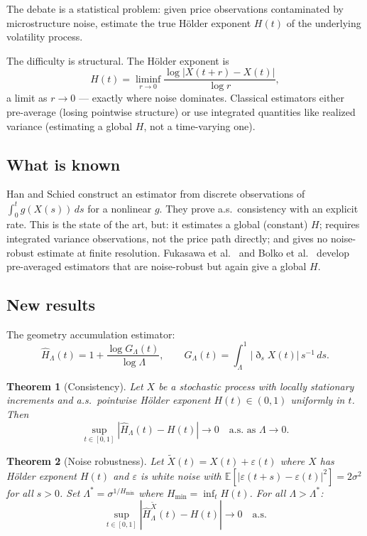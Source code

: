 \documentclass[11pt,a4paper]{article}
\newtheorem{theorem}{Theorem}[section]
\theoremstyle{definition}
\theoremstyle{remark}
\newcommand{\E}{\mathbb{E}}
\newcommand{\GL}{G_\Lambda}
\newcommand{\Hhat}{\hat{H}_\Lambda}
\begin{document}
The debate is a statistical problem: given price observations
contaminated by microstructure noise, estimate the true H\"{o}lder
exponent $H(t)$ of the underlying volatility process.

The difficulty is structural. The H\"{o}lder exponent is
\[
  H(t) = \liminf_{r\to0}\frac{\log|X(t+r)-X(t)|}{\log r},
\]
a limit as $r\to0$ — exactly where noise dominates. Classical
estimators either pre-average (losing pointwise structure) or use
integrated quantities like realized variance (estimating a global $H$,
not a time-varying one).

\subsection{What is known}

Han and Schied \cite{hanschied2023,hanschied2025} construct an
estimator from discrete observations of $\int_0^t g(X(s))\,ds$ for a
nonlinear $g$. They prove a.s.\ consistency with an explicit rate.
This is the state of the art, but: it estimates a global (constant)
$H$; requires integrated variance observations, not the price path
directly; and gives no noise-robust estimate at finite resolution.
Fukasawa et al.\ \cite{fukasawa2019} and Bolko et al.\ \cite{bolko2022}
develop pre-averaged estimators that are noise-robust but again give a
global $H$.

\subsection{New results}

The geometry accumulation estimator:
\[
  \Hhat(t) = 1 + \frac{\log\GL(t)}{\log\Lambda},
  \qquad
  \GL(t) = \int_\Lambda^1|\eth_s X(t)|\,s^{-1}\,ds.
\]

\begin{theorem}[Consistency]\label{thm:consist}
Let $X$ be a stochastic process with locally stationary increments and
a.s.\ pointwise H\"{o}lder exponent $H(t)\in(0,1)$ uniformly in $t$.
Then
\[
  \sup_{t\in[0,1]}|\Hhat(t)-H(t)|\to0\quad\text{a.s.\ as }\Lambda\to0.
\]
\end{theorem}

\begin{theorem}[Noise robustness]\label{thm:noise}
Let $\tilde X(t)=X(t)+\varepsilon(t)$ where $X$ has H\"{o}lder
exponent $H(t)$ and $\varepsilon$ is white noise with
$\E[|\varepsilon(t+s)-\varepsilon(t)|^2]=2\sigma^2$ for all $s>0$.
Set $\Lambda^*=\sigma^{1/H_{\min}}$ where $H_{\min}=\inf_t H(t)$.
For all $\Lambda>\Lambda^*$:
\[
  \sup_{t\in[0,1]}|\hat H_\Lambda^{\tilde X}(t)-H(t)|\to0
  \quad\text{a.s.}
\]
\end{theorem}
\end{document}
